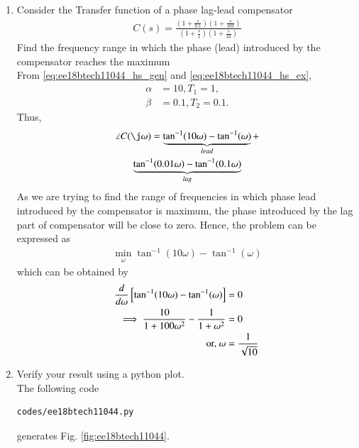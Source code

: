\begin{enumerate}[label=\thesection.\arabic*.,ref=\thesection.\theenumi]
\item Consider the Transfer function of a phase lag-lead compensator
\begin{align}
    C(s) = \frac{(1+\frac{s}{0.1})(1+\frac{s}{100})}{(1+\frac{s}{1})(1+\frac{s}{10})}
\label{eq:ee18btech11044_hs_ex}
\end{align}
Find the frequency range in which the phase (lead) introduced by the compensator reaches the maximum 
\\
\solution From \eqref{eq:ee18btech11044_hs_gen} and \eqref{eq:ee18btech11044_hs_ex},
\begin{align}
\alpha &= 10, T_1 = 1,
\\
\beta &= 0.1, T_2 = 0.1.
\end{align}
Thus, 
\begin{multline}
   \angle C(\j\omega) = \underbrace{\tan^{-1}(10\omega) - \tan^{-1}(\omega)}_{lead} + 
\\
\underbrace{\tan^{-1}(0.01\omega)  - \tan^{-1}(0.1\omega)}_{lag}
\end{multline}
As we are trying to find the range of frequencies in which phase lead introduced by the compensator is maximum, the phase introduced by the lag part of compensator will be close to zero.  Hence, the problem can be expressed as
\begin{align}
\min_{\omega}     \tan^{-1}(10 \omega ) - \tan^{-1}(\omega )
\end{align}
which can be obtained by 
\begin{align}
\frac{d}{d\omega}{}\left[\tan^{-1}(10 \omega ) - \tan^{-1}(\omega )\right] &= 0
\\
\implies \frac{10}{1+100\omega^2} - \frac{1}{1+\omega^2} &= 0
\\
\text{or, }  \omega &= \frac{1}{\sqrt{10}}
\end{align}
\item Verify your result using a python plot.
\\
\solution The following code
\begin{lstlisting}
codes/ee18btech11044.py
\end{lstlisting}
%
generates Fig. \ref{fig:ee18btech11044}.


\end{enumerate}
